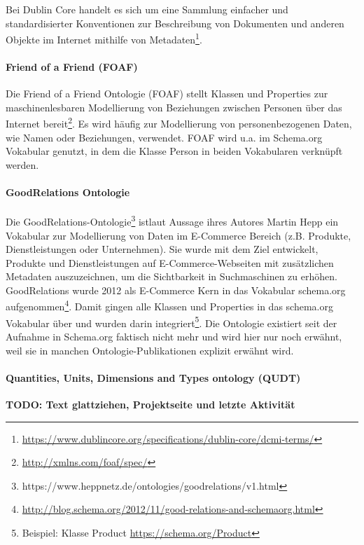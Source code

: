\documentclass{article}
\begin{document}
Bei Dublin Core handelt es sich um eine Sammlung einfacher und standardisierter Konventionen zur Beschreibung von Dokumenten und anderen Objekte im Internet mithilfe von Metadaten\footnote{\url{https://www.dublincore.org/specifications/dublin-core/dcmi-terms/}}.

\paragraph{Friend of a Friend (FOAF)}

Die Friend of a Friend Ontologie (FOAF) stellt Klassen und Properties zur maschinenlesbaren Modellierung von Beziehungen zwischen Personen über das Internet bereit\footnote{\url{http://xmlns.com/foaf/spec/}}.
Es wird häufig zur Modellierung von personenbezogenen Daten, wie Namen oder Beziehungen, verwendet.
FOAF wird u.a. im Schema.org Vokabular genutzt, in dem die Klasse Person in beiden Vokabularen verknüpft werden.

\paragraph{GoodRelations Ontologie}

Die GoodRelations-Ontologie\footnote{https://www.heppnetz.de/ontologies/goodrelations/v1.html} istlaut Aussage ihres Autores Martin Hepp ein Vokabular zur Modellierung von Daten im E-Commerce Bereich (z.B. Produkte, Dienstleistungen oder Unternehmen).
Sie wurde mit dem Ziel entwickelt, Produkte und Dienstleistungen auf E-Commerce-Webseiten mit zusätzlichen Metadaten auszuzeichnen, um die Sichtbarkeit in Suchmaschinen zu erhöhen.
GoodRelations wurde 2012 als E-Commerce Kern in das Vokabular schema.org aufgenommen\footnote{\url{http://blog.schema.org/2012/11/good-relations-and-schemaorg.html}}.
Damit gingen alle Klassen und Properties in das schema.org Vokabular über und wurden darin integriert\footnote{Beispiel: Klasse Product \url{https://schema.org/Product}}.
Die Ontologie existiert seit der Aufnahme in Schema.org faktisch nicht mehr und wird hier nur noch erwähnt, weil sie in manchen Ontologie-Publikationen explizit erwähnt wird.

\paragraph{Quantities, Units, Dimensions and Types ontology (QUDT)}

\textbf{TODO: Text glattziehen, Projektseite und letzte Aktivität}
\end{document}
